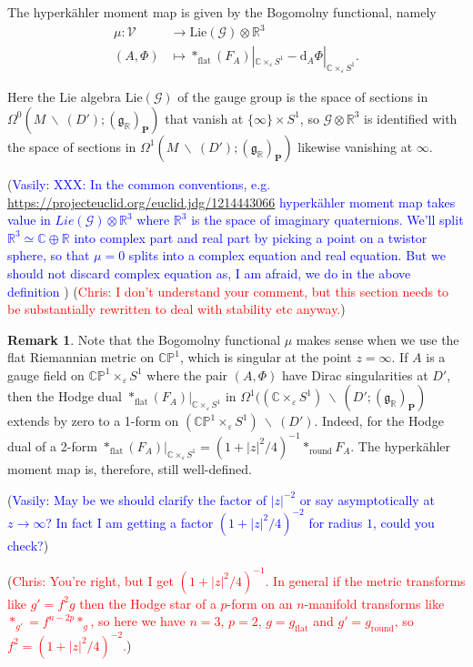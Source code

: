 \documentclass[11pt, oneside, reqno]{amsart}
\theoremstyle{definition} \newtheorem{definition}{Definition}[section]
\theoremstyle{definition} \newtheorem{remark}[definition]{Remark}
\theoremstyle{definition} \newtheorem{remarks}[definition]{Remarks}
\theoremstyle{definition} \newtheorem{question}[definition]{Question}
\theoremstyle{definition} \newtheorem*{note}{Note}
\theoremstyle{definition} \newtheorem{example}[definition]{Example}
\theoremstyle{definition} \newtheorem{examples}[definition]{Examples}
\renewcommand{\gg}{\mathfrak{g}}
\newcommand{\bb}[1]{\mathbb{#1}}
\newcommand{\mr}[1]{\mathrm{#1}}
\newcommand{\mc}[1]{\mathcal{#1}}
\newcommand{\bo}[1]{\boldsymbol{#1}}
\newcommand{\bs}{\ \backslash \ }
\newcommand{\CC}{\mathbb{C}}
\newcommand{\RR}{\mathbb{R}}
\newcommand{\eps}{\varepsilon}
\renewcommand{\d}{\mathrm{d}}
\newcommand{\chris}[1]{(\textcolor{red}{Chris: #1})}
\newcommand{\vasily}[1]{(\textcolor{blue}{Vasily: #1})}
\begin{document}
The hyperk\"ahler moment map is given by the Bogomolny functional, namely
\begin{align*}
\mu \colon \mc V &\to \mr{Lie}(\mc G) \otimes \RR^3 \\
(A,\Phi) &\mapsto \ast_{\mr{flat}} (F_A)|_{\CC \times_\eps S^1}- \d_A \Phi|_{\CC \times_\eps S^1}.
\end{align*}

Here the Lie algebra $\mr{Lie}(\mc G)$ of the gauge group is the space of sections in $\Omega^0(M \bs (D'); (\gg_\RR)_{\bo P})$ that vanish at $\{\infty\} \times S^1$, so $\mc G \otimes \RR^3$ is identified with the space of sections in $\Omega^1(M \bs (D'); (\gg_\RR)_{\bo P})$ likewise vanishing at $\infty$.

\vasily{XXX: In the common conventions, e.g. \url{https://projecteuclid.org/euclid.jdg/1214443066} hyperk\"ahler moment map takes value in $Lie(\mc G) \otimes \mathbb{R}^3$ where $\mathbb{R}^3$ is the space of imaginary quaternions. 
  We'll split $\mathbb{R}^{3} \simeq \mathbb{C} \oplus \mathbb{R}$ into complex part
  and real part by picking a point on a twistor sphere, so that $\mu  = 0$
  splits into a complex equation and real equation. But we should not discard complex
equation as, I am afraid, we do in the above definition } \chris{I don't understand your comment, but this section needs to be substantially rewritten to deal with stability etc anyway.}

\begin{remark} \label{flat_metric_remark}
Note that the Bogomolny functional $\mu$ makes sense when we use the flat Riemannian metric on $\bb{CP}^1$, which is singular at the point $z = \infty$.  If $A$ is a gauge field on $\bb{CP}^1 \times_\eps S^1$ where the pair $(A,\Phi)$ have Dirac singularities at $D'$, then the Hodge dual $\ast_{\mr{flat}} (F_A)|_{\CC \times_\eps S^1}$ in $\Omega^1((\CC \times_\eps S^1) \bs (D'; (\gg_\RR)_{\bo P})$ extends by zero to a 1-form on $(\bb{CP}^1 \times_\eps S^1) \bs (D')$.  Indeed, for the Hodge dual of a 2-form $\ast_{\mr{flat}} (F_A)|_{\CC \times_\eps S^1} = (1+|z|^2/4)^{-1} \ast_{\mr{round}} F_A$.  The hyperk\"ahler moment map is, therefore, still well-defined.
\end{remark}
\vasily{May be we should  clarify the factor of $|z|^{-2}$ or say asymptotically at $z \to \infty$?  In fact I am getting a factor $(1+|z|^2/4)^{-2}$ for radius $1$, could you check?} 

\chris{You're right, but I get $(1+|z|^2/4)^{-1}$.  In general if the metric transforms like $g' = f^2 g$ then the Hodge star of a $p$-form on an $n$-manifold transforms like $\ast_{g'} = f^{n-2p} \ast_g$, so here we have $n=3$, $p=2$, $g = g_{\mr{flat}}$ and $g'=g_{\mr{round}}$, so $f^2 = (1+|z|^2/4)^{-2}$.}
\end{document}
